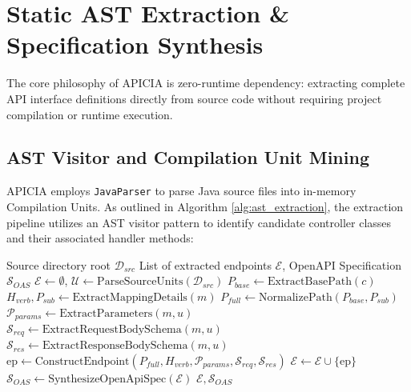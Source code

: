 \documentclass[conference]{IEEEtran}
\begin{document}
\section{Static AST Extraction \& Specification Synthesis}
\label{sec:extraction}

The core philosophy of APICIA is zero-runtime dependency: extracting complete API interface definitions directly from source code without requiring project compilation or runtime execution.

\subsection{AST Visitor and Compilation Unit Mining}
APICIA employs \texttt{JavaParser} to parse Java source files into in-memory Compilation Units. As outlined in Algorithm \ref{alg:ast_extraction}, the extraction pipeline utilizes an AST visitor pattern to identify candidate controller classes and their associated handler methods:

\begin{algorithm}[h]
\caption{Static AST Endpoint Extraction Algorithm}
\label{alg:ast_extraction}
\begin{algorithmic}[1]
\REQUIRE Source directory root $\mathcal{D}_{src}$
\ENSURE List of extracted endpoints $\mathcal{E}$, OpenAPI Specification $\mathcal{S}_{OAS}$
\STATE $\mathcal{E} \leftarrow \emptyset$, $\mathcal{U} \leftarrow \text{ParseSourceUnits}(\mathcal{D}_{src})$
            \STATE $P_{base} \leftarrow \text{ExtractBasePath}(c)$
                    \STATE $H_{verb}, P_{sub} \leftarrow \text{ExtractMappingDetails}(m)$
                    \STATE $P_{full} \leftarrow \text{NormalizePath}(P_{base}, P_{sub})$
                    \STATE $\mathcal{P}_{params} \leftarrow \text{ExtractParameters}(m, u)$
                    \STATE $\mathcal{S}_{req} \leftarrow \text{ExtractRequestBodySchema}(m, u)$
                    \STATE $\mathcal{S}_{res} \leftarrow \text{ExtractResponseBodySchema}(m, u)$
                    \STATE $\text{ep} \leftarrow \text{ConstructEndpoint}(P_{full}, H_{verb}, \mathcal{P}_{params}, \mathcal{S}_{req}, \mathcal{S}_{res})$
                    \STATE $\mathcal{E} \leftarrow \mathcal{E} \cup \{\text{ep}\}$
                \ENDIF
            \ENDFOR
        \ENDIF
    \ENDFOR
\ENDFOR
\STATE $\mathcal{S}_{OAS} \leftarrow \text{SynthesizeOpenApiSpec}(\mathcal{E})$
\RETURN $\mathcal{E}, \mathcal{S}_{OAS}$
\end{algorithmic}
\end{algorithm}
\end{document}

